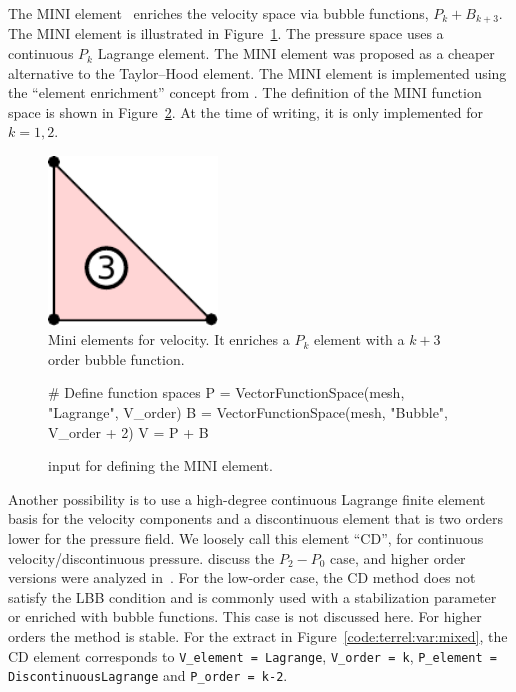 The MINI element~\citep{ArnoldBrezziFortin1984} enriches the velocity
space via bubble functions, $P_k + B_{k+3}$. The MINI element is
illustrated in Figure~\ref{fig:terrel:MINIElement}.  The pressure
space uses a continuous $P_{k}$ Lagrange element.  The MINI element
was proposed as a cheaper alternative to the Taylor--Hood element. The
MINI element is implemented using the ``element enrichment'' concept
from \ufl{}. The \ufl{} definition of the MINI function space is shown
in Figure~\ref{code:terrel:MINI}.  At the time of writing, it is only
implemented for $k=1, 2$.
%
\begin{figure}
  \center
  \includegraphics[width=0.4\textwidth]{chapters/terrel/pdf/MINI.pdf}
  \caption{Mini elements for velocity.  It enriches a $P_k$ element with
  a $k+3$ order bubble function.}
  \label{fig:terrel:MINIElement}
\end{figure}
%
\begin{figure}
\begin{python}
# Define function spaces
P = VectorFunctionSpace(mesh, "Lagrange", V_order)
B = VectorFunctionSpace(mesh, "Bubble", V_order + 2)
V = P + B
\end{python}
\caption{\ufl{} input for defining the MINI element.}
\label{code:terrel:MINI}
\end{figure}

Another possibility is to use a high-degree continuous Lagrange finite
element basis for the velocity components and a discontinuous element
that is two orders lower for the pressure field. We loosely call
this element ``CD'', for continuous velocity/discontinuous pressure.
\citet{BrezziFortin1991} discuss the $P_2-P_0$ case, and higher order
versions were analyzed in~\citet{MadayPateraRonquist1992}.  For the
low-order case, the CD method does not satisfy the LBB condition
and is commonly used with a stabilization parameter or enriched with
bubble functions. This case is not discussed here. For higher orders the
method is stable.  For the extract
in Figure~\ref{code:terrel:var:mixed}, the CD element corresponds to
{\tt V\_element = Lagrange}, {\tt V\_order = k}, {\tt P\_element =
DiscontinuousLagrange} and {\tt P\_order = k-2}.

